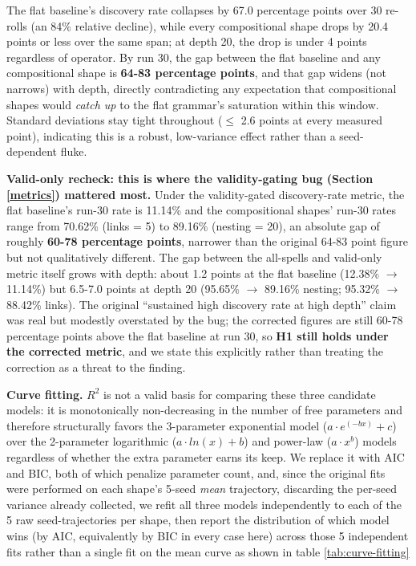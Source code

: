 \documentclass[]{article}
\begin{document}
        The flat baseline's discovery rate collapses by 67.0 percentage points over 30 re-rolls (an 84\% relative decline), while every compositional shape drops by 20.4 points or less over the same span; at depth 20, the drop is under 4 points regardless of operator. By run 30, the gap between the flat baseline and any compositional shape is \textbf{64-83 percentage points}, and that gap widens (not narrows) with depth, directly contradicting any expectation that compositional shapes would \textit{catch up} to the flat grammar's saturation within this window. Standard deviations stay tight throughout ($\leq$ 2.6 points at every measured point), indicating this is a robust, low-variance effect rather than a seed-dependent fluke.

        \textbf{Valid-only recheck: this is where the validity-gating bug (Section \ref{metrics}) mattered most.} Under the validity-gated discovery-rate metric, the flat baseline's run-30 rate is 11.14\% and the compositional shapes' run-30 rates range from 70.62\% (links = 5) to 89.16\% (nesting = 20), an absolute gap of roughly \textbf{60-78 percentage points}, narrower than the original 64-83 point figure but not qualitatively different. The gap between the all-spells and valid-only metric itself grows with depth: about 1.2 points at the flat baseline (12.38\% $\rightarrow$ 11.14\%) but 6.5-7.0 points at depth 20 (95.65\% $\rightarrow$ 89.16\% nesting; 95.32\% $\rightarrow$ 88.42\% links). The original ``sustained high discovery rate at high depth'' claim was real but modestly overstated by the bug; the corrected figures are still 60-78 percentage points above the flat baseline at run 30, so \textbf{H1 still holds under the corrected metric}, and we state this explicitly rather than treating the correction as a threat to the finding.

        \textbf{Curve fitting.} $R^2$ is not a valid basis for comparing these three candidate models: it is monotonically non-decreasing in the number of free parameters and therefore structurally favors the 3-parameter exponential model ($a·e^{(-bx)}+c$) over the 2-parameter logarithmic ($a·ln(x)+b$) and power-law ($a·x^b$) models regardless of whether the extra parameter earns its keep. We replace it with AIC and BIC, both of which penalize parameter count, and, since the original fits were performed on each shape's 5-seed \textit{mean} trajectory, discarding the per-seed variance already collected, we refit all three models independently to each of the 5 raw seed-trajectories per shape, then report the distribution of which model wins (by AIC, equivalently by BIC in every case here) across those 5 independent fits rather than a single fit on the mean curve as shown in table \ref{tab:curve-fitting}
\end{document}
